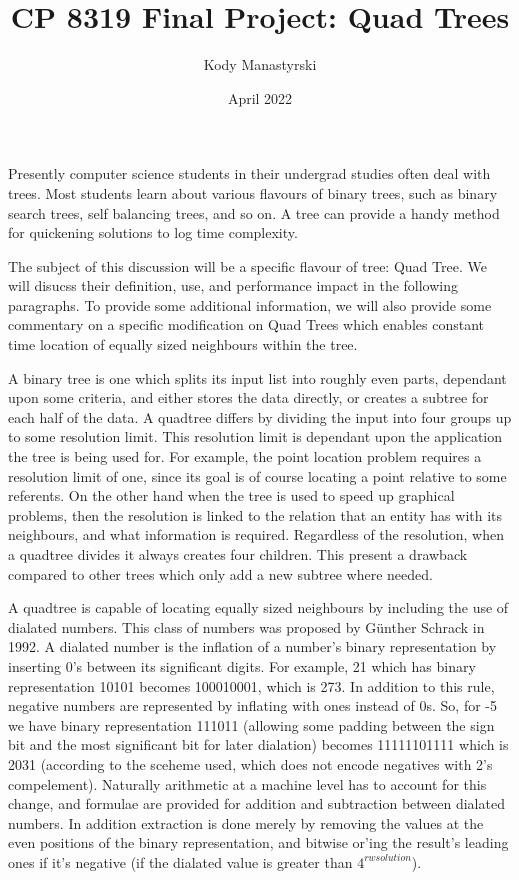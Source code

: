 \documentclass{article}
\title{CP 8319 Final Project: Quad Trees}
\author{Kody Manastyrski}
\date{April 2022}
\begin{document}
\maketitle

Presently computer science students in their undergrad studies often deal with 
trees. 
Most students learn about various flavours of binary trees, such as binary search
trees, self balancing trees, and so on. 
A tree can provide a handy method for quickening solutions to log time complexity.

The subject of this discussion will be a specific flavour of tree: Quad Tree. 
We will disucss their definition, use, and performance impact in the following
paragraphs. 
To provide some additional information, we will also provide some commentary on
a specific modification on Quad Trees which enables constant time location of 
equally sized neighbours within the tree.

A binary tree is one which splits its input list into roughly even parts, 
dependant upon some criteria, and either stores the data directly, or creates a 
subtree for each half of the data. 
A quadtree differs by dividing the input into four groups up to some resolution
limit. 
This resolution limit is dependant upon the application the tree is being used for. 
For example, the point location problem requires a resolution limit of one, since
its goal is of course locating a point relative to some referents. 
On the other hand when the tree is used to speed up graphical problems, then the
resolution is linked to the relation that an entity has with its neighbours, and what 
information is required. 
Regardless of the resolution, when a quadtree divides it always creates four children.
This present a drawback compared to other trees which only add a new subtree where
needed.

A quadtree is capable of locating equally sized neighbours by including the use
of dialated numbers. 
This class of numbers was proposed by G{\"u}nther Schrack \cite{Schrack} in 1992. 
A dialated number is the inflation of a number's binary representation by inserting
0's between its significant digits. 
For example, 21 which has binary representation 10101 becomes 100010001, which is
273. 
In addition to this rule, negative numbers are represented by inflating with ones
instead of 0s.
So, for -5 we have binary representation 111011 (allowing some padding between 
the sign bit and the most significant bit for later dialation) becomes 11111101111
which is 2031 (according to the sceheme used, which does not encode negatives with
2's compelement).
Naturally arithmetic at a machine level has to account for this change, and formulae
are provided for addition and subtraction between dialated numbers.
In addition extraction is done merely by removing the values at the even positions 
of the binary representation, and bitwise or'ing the result's leading ones if it's
negative (if the dialated value is greater than $4^{rwsolution}$).
\end{document}
